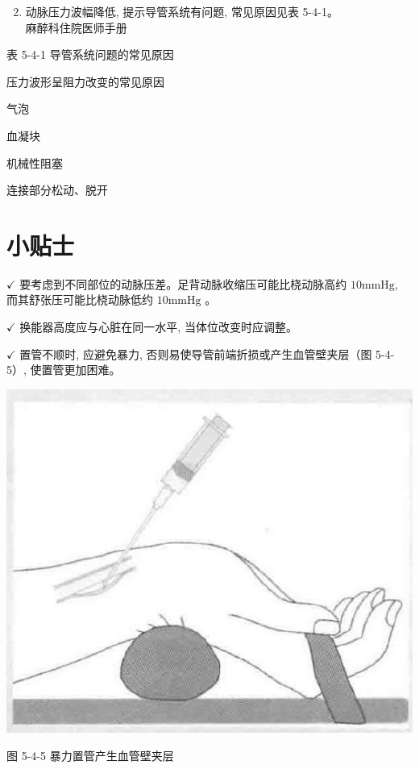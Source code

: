 \documentclass[10pt]{article}
\begin{document}
\begin{enumerate}
  \setcounter{enumi}{1}
  \item 动脉压力波幅降低, 提示导管系统有问题, 常见原因见表 5-4-1。\\
麻醉科住院医师手册
\end{enumerate}

表 5-4-1 导管系统问题的常见原因

压力波形呈阻力改变的常见原因

气泡

血凝块

机械性阻塞

连接部分松动、脱开

\section*{小贴士}
$\checkmark$ 要考虑到不同部位的动脉压差。足背动脉收缩压可能比桡动脉高约 $10 \mathrm{mmHg}$, 而其舒张压可能比桡动脉低约 $10 \mathrm{mmHg}$ 。

$\checkmark$ 换能器高度应与心脏在同一水平, 当体位改变时应调整。

$\checkmark$ 置管不顺时, 应避免暴力, 否则易使导管前端折损或产生血管壁夹层（图 5-4-5）, 使置管更加困难。

\begin{center}
\includegraphics[max width=\textwidth]{2024_07_05_645bb794a4d4f32ee0c8g-300}
\end{center}

图 5-4-5 暴力置管产生血管壁夹层
\end{document}
